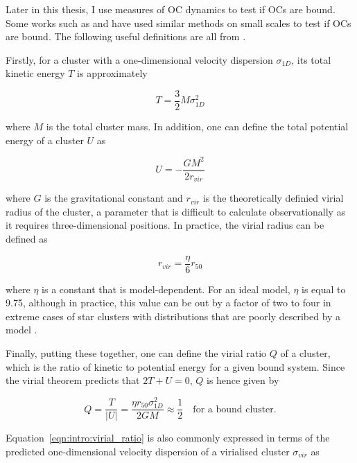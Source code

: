 Later in this thesis, I use measures of OC dynamics to test if OCs are bound. Some works such as \cite{bravi_gaia-eso_2018} and \cite{pang_3d_2021} have used similar methods on small scales to test if OCs are bound. The following useful definitions are all from \cite{portegies_zwart_young_2010}.

Firstly, for a cluster with a one-dimensional velocity dispersion $\sigma_{1D}$, its total kinetic energy $T$ is approximately

\begin{equation}
	T = \frac{3}{2} M \sigma_{1D}^2
\end{equation}

\noindent
where $M$ is the total cluster mass. In addition, one can define the total potential energy of a cluster $U$ as 

\begin{equation}
	U = - \frac{GM^2}{2r_{vir}}
\end{equation}

\noindent
where $G$ is the gravitational constant and $r_{vir}$ is the theoretically definied virial radius of the cluster, a parameter that is difficult to calculate observationally as it requires three-dimensional positions. In practice, the virial radius can be defined as 

\begin{equation}
	r_{vir} = \frac{\eta}{6} r_{50}
\end{equation}

\noindent
where $\eta$ is a constant that is model-dependent. For an ideal \cite{plummer_problem_1911} model, $\eta$ is equal to 9.75, although in practice, this value can be out by a factor of two to four in extreme cases of star clusters with distributions that are poorly described by a \cite{plummer_problem_1911} model \citep{portegies_zwart_young_2010}.

Finally, putting these together, one can define the virial ratio $Q$ of a cluster, which is the ratio of kinetic to potential energy for a given bound system. Since the virial theorem predicts that $2T + U = 0$, $Q$ is hence given by

\begin{equation}
	Q = \frac{T}{\left| U \right|}
	  = \frac{\eta r_{50} \sigma_{1D}^2}{2GM}
	  \approx \frac{1}{2} \quad \text{for a bound cluster.}
	\label{eqn:intro:virial_ratio}
\end{equation}

\noindent
Equation~\ref{eqn:intro:virial_ratio} is also commonly expressed in terms of the predicted one-dimensional velocity dispersion of a virialised cluster $\sigma_{vir}$ \citep[e.g. in][]{bravi_gaia-eso_2018} as

